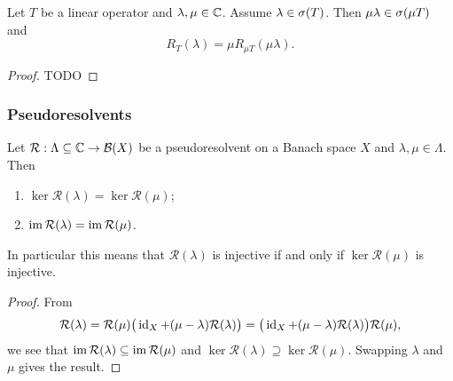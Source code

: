 \begin{lemma}
Let $T$ be a linear operator and $\lambda,\mu\in\mathbb{C}$. Assume $\lambda\in \sigma(T)$. Then $\mu\lambda\in \sigma(\mu T)$ and
\[ R_T(\lambda) = \mu R_{\mu T}(\mu \lambda). \]
\end{lemma}
\begin{proof}
TODO
\end{proof}


\subsubsection{Pseudoresolvents}

\begin{lemma} \label{imageRangePseudoresolvents}
Let $\mathcal{R}:\Lambda \subseteq \mathbb{C} \to \operatorname{\mathcal{B}}(X)$ be a pseudoresolvent on a Banach space $X$ and $\lambda,\mu\in\Lambda$. Then
\begin{enumerate}
\item $\ker\mathcal{R}(\lambda) = \ker\mathcal{R}(\mu)$;
\item $\operatorname{im}\mathcal{R}(\lambda) = \operatorname{im}\mathcal{R}(\mu)$.
\end{enumerate}
In particular this means that $\mathcal{R}(\lambda)$ is injective \textup{if and only if} $\ker\mathcal{R}(\mu)$ is injective.
\end{lemma}
\begin{proof}
From
\[ \mathcal{R}(\lambda) = \mathcal{R}(\mu)\big(\operatorname{id}_X + (\mu-\lambda)\mathcal{R}(\lambda)\big) = \big(\operatorname{id}_X + (\mu-\lambda)\mathcal{R}(\lambda)\big)\mathcal{R}(\mu), \]
we see that $\operatorname{im}\mathcal{R}(\lambda) \subseteq \operatorname{im}\mathcal{R}(\mu)$ and $\ker\mathcal{R}(\lambda) \supseteq \ker\mathcal{R}(\mu)$. Swapping $\lambda$ and $\mu$ gives the result.
\end{proof}


